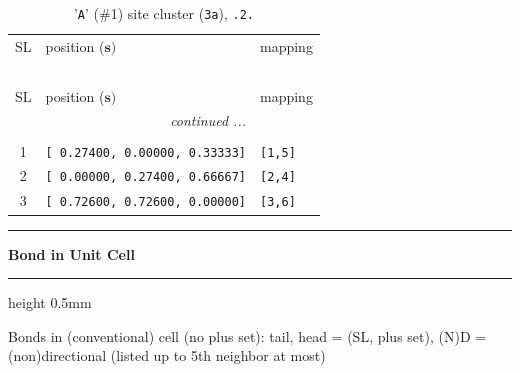 \documentclass[fleqn,10pt,landscape]{jsarticle}
\begin{document}
\renewcommand{\arraystretch}{1.6}
\begin{longtable}[l]{cll}
\captionsetup{justification=raggedright, singlelinecheck=off}
\caption{'\texttt{A}' (\#1) site cluster (\texttt{3a}), \texttt{.2.}}
 \\
 \hline \hline
SL & position ($\bm{s})$ & mapping \\ \hline \endfirsthead

\multicolumn{2}{l}{\tablename\ \thetable{}} \\
 \hline \hline
SL & position ($\bm{s})$ & mapping \\ \hline \endhead

 \hline \hline
\multicolumn{2}{r}{\footnotesize\it continued ...} \\ \endfoot

 \hline \hline
\multicolumn{2}{r}{} \\ \endlastfoot

1 & \texttt{[ 0.27400, 0.00000, 0.33333]} & \texttt{[1,5]} \\ \hline
2 & \texttt{[ 0.00000, 0.27400, 0.66667]} & \texttt{[2,4]} \\ \hline
3 & \texttt{[ 0.72600, 0.72600, 0.00000]} & \texttt{[3,6]} \\
\end{longtable}
\vspace{5mm}
\noindent \rule[0.5mm]{5mm}{0.5mm}\hspace{3mm}\textbf{Bond in Unit Cell}\hspace{3mm}\leaders\hrule height 0.5mm\hfill\kern0pt
\vspace{3mm}

\noindent Bonds in (conventional) cell (no plus set): tail, head = (SL, plus set), (N)D = (non)directional (listed up to 5th neighbor at most)
\end{document}
